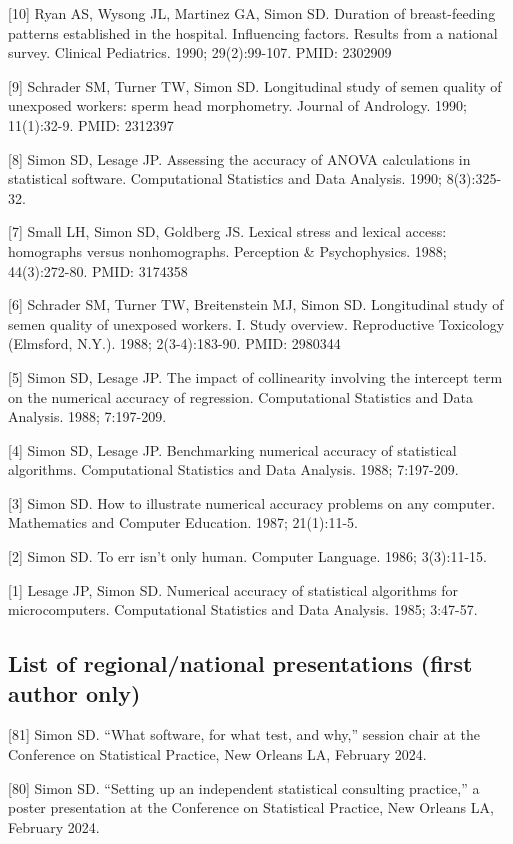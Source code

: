 \documentclass[
  12pt,
]{article}
\begin{document}
{[}10{]} Ryan AS, Wysong JL, Martinez GA, Simon SD. Duration of
breast-feeding patterns established in the hospital. Influencing
factors. Results from a national survey. Clinical Pediatrics. 1990;
29(2):99-107. PMID: 2302909

{[}9{]} Schrader SM, Turner TW, Simon SD. Longitudinal study of semen
quality of unexposed workers: sperm head morphometry. Journal of
Andrology. 1990; 11(1):32-9. PMID: 2312397

{[}8{]} Simon SD, Lesage JP. Assessing the accuracy of ANOVA
calculations in statistical software. Computational Statistics and Data
Analysis. 1990; 8(3):325-32.

{[}7{]} Small LH, Simon SD, Goldberg JS. Lexical stress and lexical
access: homographs versus nonhomographs. Perception \& Psychophysics.
1988; 44(3):272-80. PMID: 3174358

{[}6{]} Schrader SM, Turner TW, Breitenstein MJ, Simon SD. Longitudinal
study of semen quality of unexposed workers. I. Study overview.
Reproductive Toxicology (Elmsford, N.Y.). 1988; 2(3-4):183-90. PMID:
2980344

{[}5{]} Simon SD, Lesage JP. The impact of collinearity involving the
intercept term on the numerical accuracy of regression. Computational
Statistics and Data Analysis. 1988; 7:197-209.

{[}4{]} Simon SD, Lesage JP. Benchmarking numerical accuracy of
statistical algorithms. Computational Statistics and Data Analysis.
1988; 7:197-209.

{[}3{]} Simon SD. How to illustrate numerical accuracy problems on any
computer. Mathematics and Computer Education. 1987; 21(1):11-5.

{[}2{]} Simon SD. To err isn't only human. Computer Language. 1986;
3(3):11-15.

{[}1{]} Lesage JP, Simon SD. Numerical accuracy of statistical
algorithms for microcomputers. Computational Statistics and Data
Analysis. 1985; 3:47-57.

\subsection{List of regional/national presentations (first author
only)}\label{list-of-regionalnational-presentations-first-author-only}

{[}81{]} Simon SD. ``What software, for what test, and why,'' session
chair at the Conference on Statistical Practice, New Orleans LA,
February 2024.

{[}80{]} Simon SD. ``Setting up an independent statistical consulting
practice,'' a poster presentation at the Conference on Statistical
Practice, New Orleans LA, February 2024.
\end{document}
